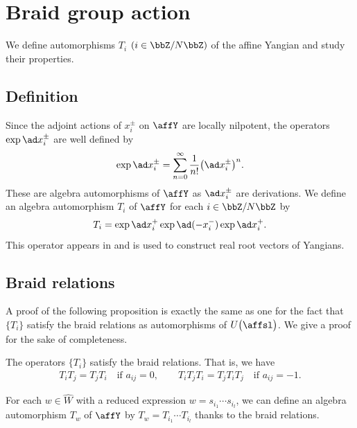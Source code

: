\section{Braid group action}\label{section3}

We define automorphisms $T_i$ $(i \in \bbZ/N\bbZ)$ of the affine Yangian and study their properties.

\subsection{Definition}

Since the adjoint actions of $x_i^{\pm}$ on $\affY$ are locally nilpotent, the operators $\exp\ad x_i^{\pm}$ are well defined by
\begin{gather*}
\exp\ad x_i^{\pm} = \sum_{n=0}^{\infty} \dfrac{1}{n!} \big(\ad x_i^{\pm}\big)^n.
\end{gather*}
These are algebra automorphisms of $\affY$ as $\ad x_i^{\pm}$ are derivations. We define an algebra automorphism $T_i$ of $\affY$ for each $i \in \bbZ/N\bbZ$ by
\begin{gather*}
T_i = \exp\ad x_i^{+} \exp\ad (-x_i^{-}) \exp\ad x_i^{+}.
\end{gather*}
This operator appears in \cite{MR3861718} and is used to construct real root vectors of Yangians.

\subsection{Braid relations}

A proof of the following proposition is exactly the same as one for the fact that $\{T_i\}$ satisfy the braid relations as automorphisms of $U\big(\affsl\big)$. We give a proof for the sake of completeness.

\begin{prop}\label{prop:braid}The operators $\{T_i\}$ satisfy the braid relations. That is, we have
\begin{gather*}
T_i T_j = T_j T_i \quad \text{if $a_{ij}=0$},\qquad T_i T_j T_i = T_j T_i T_j \quad \text{if $a_{ij}=-1$}.
\end{gather*}
\end{prop}
For each $w \in \hat{W}$ with a reduced expression $w=s_{i_1} \cdots s_{i_l}$, we can define an algebra automorphism $T_w$ of $\affY$ by $T_w = T_{i_1} \cdots T_{i_l}$ thanks to the braid relations.

